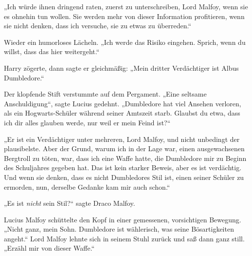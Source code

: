 „Ich würde ihnen dringend raten, zuerst zu unterschreiben, Lord Malfoy, wenn sie es ohnehin tun wollen. Sie werden mehr von dieser Information profitieren, wenn sie nicht denken, dass ich versuche, sie zu etwas zu überreden.“

Wieder ein humorloses Lächeln.
„Ich werde das Risiko eingehen. Sprich, wenn du willst, dass das hier weitergeht.“

Harry zögerte, dann sagte er gleichmäßig:
„Mein dritter Verdächtiger ist Albus Dumbledore.“

Der klopfende Stift verstummte auf dem Pergament.
„Eine seltsame Anschuldigung“, sagte Lucius gedehnt.
„Dumbledore hat viel Ansehen verloren, als ein Hogwarts-Schüler während seiner Amtszeit starb. Glaubst du etwa, dass ich dir alles glauben werde, nur weil er mein Feind ist?“

„Er ist ein Verdächtiger unter mehreren, Lord Malfoy, und nicht unbedingt der plausibelste. Aber der Grund, warum ich in der Lage war, einen ausgewachsenen Bergtroll zu töten, war, dass ich eine Waffe hatte, die Dumbledore mir zu Beginn des Schuljahres gegeben hat. Das ist kein starker Beweis, aber es ist verdächtig. Und wenn sie denken, dass es nicht Dumbledores Stil ist, einen seiner Schüler zu ermorden, nun, derselbe Gedanke kam mir auch schon.“

„Es ist \emph{nicht} sein Stil?“ sagte Draco Malfoy.

Lucius Malfoy schüttelte den Kopf in einer gemessenen, vorsichtigen Bewegung.
„Nicht ganz, mein Sohn. Dumbledore ist wählerisch, was seine Bösartigkeiten angeht.“
Lord Malfoy lehnte sich in seinem Stuhl zurück und saß dann ganz still.
„Erzähl mir von dieser Waffe.“


